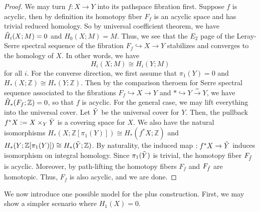 \documentclass{article}
\theoremstyle{definition}
\theoremstyle{definition}
\theoremstyle{definition}
\theoremstyle{definition}
\theoremstyle{definition}
\theoremstyle{definition}
\theoremstyle{definition}
\begin{document}
\begin{proof}
We may turn $f:X\xrightarrow{}Y$ into its pathspace fibration first. Suppose $f$ is acyclic, then by definition its homotopy fiber $F_f$ is an acyclic space and has trivial reduced homology. So by universal coefficient theorem, we have $\Tilde{H}_i(X;M)=0$ and $H_0(X;M)=M$. Thus, we see that the $E_2$ page of the Leray-Serre spectral sequence of the fibration $F_f\hookrightarrow X\xrightarrow{}Y$ stabilizes and converges to the homology of $X$. In other words, we have
\[
H_i(X;M)\cong H_i(Y;M)
\]
for all $i$.
For the converse direction, we first assume that $\pi_1 (Y)=0$ and $H_*(X;\mathbb{Z})\cong H_*(Y;\mathbb{Z})$. Then by the comparison theroem for Serre spectral sequence associated to the fibrations $F_f\hookrightarrow{}X\xrightarrow{}Y$ and $*\hookrightarrow Y\xrightarrow{=}Y$, we have $\Tilde{H}_*(F_f;\mathbb{Z})=0$, so that $f$ is acyclic. For the general case, we may lift everything into the universal cover. Let $\Tilde{Y}$ be the universal cover for $Y$. Then, the pullback $f^*X:=X\times_Y \Tilde{Y}$ is a covering space for $X$. We also have the natural isomorphisms $H_*(X;\mathbb{Z}[\pi_1(Y)])\cong H_*(f^*X;\mathbb{Z})$ and $H_*(Y;\mathbb{Z}[\pi_1(Y)])\cong H_*(\Tilde{Y};\mathbb{Z})$. By naturality, the induced map $\title{f}:f^*X\xrightarrow{}\Tilde{Y}$ induces isomorphism on integral homology. Since $\pi_1(\Tilde{Y})$ is trivial, the homotopy fiber $F_{\Tilde{f}}$ is acyclic. Moreover, by path-lifting the homotopy fibers $F_f$ and $F_{\Tilde{f}}$ are homotopic. Thus, $F_f$ is also acyclic, and we are done. 
\end{proof}
We now introduce one possible model for the plus construction. First, we may show a simpler scenario where $H_1(X)=0$. 
\end{document}
